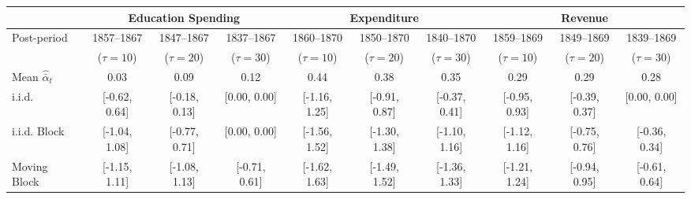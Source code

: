 \begin{tabular}{@{}lccccccccc@{}}
		\toprule
		 & \multicolumn{3}{c}{Education Spending}        & \multicolumn{3}{c}{Expenditure}            & \multicolumn{3}{c}{Revenue}                \\ \midrule
Post-period	 & 1857--1867     & 1847--1867      & 1837--1867      & 1860--1870     & 1850--1870     & 1840--1870  	  & 1859--1869      & 1849--1869   	  & 1839--1869   \\
	 	 & ($\tau = 10$)  & ($\tau = 20$)   & ($\tau = 30$)   & ($\tau = 10$)  & ($\tau = 20$)  & ($\tau = 30$)   &  ($\tau = 10$)  &  ($\tau = 20$)  &  ($\tau = 30$)  \\
		\hline
		Mean $\hat{\bar{\alpha}}_{t}$                       	   &   0.03        & 	0.09       & 	0.12       &       0.44   &   0.38	     & 	0.35	    & 	0.29       &   0.29       & 	0.28\\
		i.i.d.                      		   & [-0.62, 0.64]  & [-0.18, 0.13]  & [0.00, 0.00]  & [-1.16, 1.25] & [-0.91, 0.87] & [-0.37, 0.41] & [-0.95, 0.93] & [-0.39, 0.37] & [0.00, 0.00] \\
		i.i.d. Block                        & [-1.04, 1.08]  & [-0.77, 0.71]  & [0.00, 0.00]  & [-1.56, 1.52] & [-1.30, 1.38] & [-1.10, 1.16] & [-1.12, 1.16] & [-0.75, 0.76] & [-0.36, 0.34] \\
		Moving Block                        & [-1.15, 1.11]  & [-1.08, 1.13]  & [-0.71, 0.61]  & [-1.62, 1.63] & [-1.49, 1.52] & [-1.36, 1.33] & [-1.21, 1.24] & [-0.94, 0.95] & [-0.61, 0.64] \\ \bottomrule
\end{tabular}
